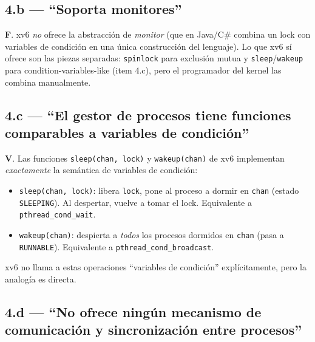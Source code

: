 \documentclass[11pt,a4paper]{article}
\begin{document}
\subsection*{4.b --- ``Soporta monitores''}

\begin{respuesta}
\textbf{F}. xv6 \emph{no} ofrece la abstracción de \emph{monitor}
(que en Java/C\# combina un lock con variables de condición en una
única construcción del lenguaje). Lo que xv6 sí ofrece son las
piezas separadas: \texttt{spinlock} para exclusión mutua y
\texttt{sleep}/\texttt{wakeup} para condition-variables-like
(item 4.c), pero el programador del kernel las combina manualmente.
\end{respuesta}

\subsection*{4.c --- ``El gestor de procesos tiene funciones comparables a variables de condición''}

\begin{respuesta}
\textbf{V}. Las funciones \texttt{sleep(chan, lock)} y
\texttt{wakeup(chan)} de xv6 implementan \emph{exactamente} la
semántica de variables de condición:

\begin{itemize}[leftmargin=*,nosep]
    \item \texttt{sleep(chan, lock)}: libera \texttt{lock}, pone al
        proceso a dormir en \texttt{chan} (estado \texttt{SLEEPING}).
        Al despertar, vuelve a tomar el lock. Equivalente a
        \texttt{pthread\_cond\_wait}.
    \item \texttt{wakeup(chan)}: despierta a \emph{todos} los
        procesos dormidos en \texttt{chan} (pasa a
        \texttt{RUNNABLE}). Equivalente a
        \texttt{pthread\_cond\_broadcast}.
\end{itemize}

xv6 no llama a estas operaciones ``variables de condición''
explícitamente, pero la analogía es directa.
\end{respuesta}

\subsection*{4.d --- ``No ofrece ningún mecanismo de comunicación y sincronización entre procesos''}
\end{document}
